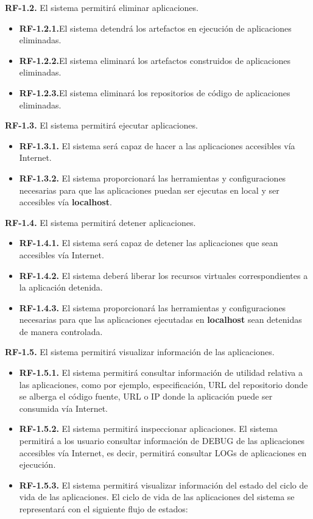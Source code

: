 \documentclass[a4paper,11pt]{book}
\begin{document}
\textbf{RF-1.2.} El sistema permitirá eliminar aplicaciones.
\begin{itemize}
 \item 	\textbf{RF-1.2.1.}El sistema detendrá los artefactos en ejecución de aplicaciones eliminadas.
  \item 	\textbf{RF-1.2.2.}El sistema eliminará los artefactos construidos de aplicaciones eliminadas.
   \item  \textbf{RF-1.2.3.}El sistema eliminará los repositorios de código de aplicaciones eliminadas.	\\
\end{itemize}


\textbf{RF-1.3.} El sistema permitirá ejecutar aplicaciones.
\begin{itemize}
 \item \textbf{RF-1.3.1.} El sistema será capaz de hacer a las aplicaciones accesibles vía Internet.
 \item  \textbf{RF-1.3.2.} El sistema proporcionará las herramientas  y configuraciones necesarias para que las aplicaciones puedan ser ejecutas en local y ser accesibles vía \textbf{localhost}.  \\
\end{itemize}


\textbf{RF-1.4.} El sistema permitirá detener aplicaciones.

\begin{itemize}
 \item  \textbf{RF-1.4.1.} El sistema será capaz de detener las aplicaciones que sean accesibles vía Internet.
  \item  \textbf{RF-1.4.2.} El sistema deberá liberar los recursos virtuales correspondientes a la aplicación detenida.
  \item  \textbf{RF-1.4.3.} El sistema proporcionará las herramientas  y configuraciones necesarias para que las aplicaciones ejecutadas en \textbf{localhost}  sean detenidas de manera controlada. \\
\end{itemize}

\textbf{RF-1.5.} El sistema permitirá visualizar información de las aplicaciones.

\begin{itemize}
\item \textbf{RF-1.5.1.} El sistema permitirá consultar  información de utilidad relativa a las aplicaciones,  como por ejemplo, especificación, URL del repositorio donde se alberga el código fuente, URL o IP donde la aplicación puede ser consumida vía Internet.
\item \textbf{RF-1.5.2.} El sistema permitirá inspeccionar aplicaciones. El sistema permitirá a los usuario consultar información de DEBUG de las aplicaciones accesibles vía Internet, es decir, permitirá consultar LOGs de aplicaciones en ejecución.
\item \textbf{RF-1.5.3.} El sistema permitirá visualizar información del estado del ciclo de vida de las aplicaciones. El ciclo de vida de las aplicaciones del sistema se representará con el siguiente flujo de estados:\\
\end{itemize}
\end{document}
